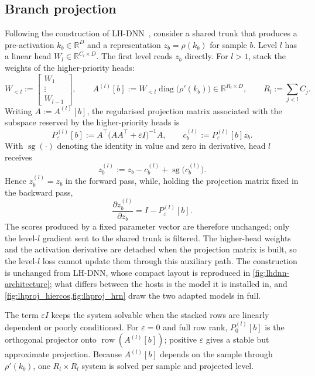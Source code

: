 \subsection{Branch projection}
\label{ssec:lhproj_construction}
\label{ssec:lhproj_forward}

Following the construction of LH-DNN~\cite{fiaschi2024informed}, consider a
shared trunk that produces a pre-activation $k_b\in\mathbb{R}^{D}$ and a
representation $z_b=\rho(k_b)$ for sample $b$. Level $l$ has a linear head
$W_l\in\mathbb{R}^{C_l\times D}$. The first level reads $z_b$ directly. For
$l>1$, stack the weights of the higher-priority heads:
\[
W_{<l}:=
\begin{bmatrix}W_1\\ \vdots\\ W_{l-1}\end{bmatrix},
\qquad
A^{(l)}[b]
:=W_{<l}\operatorname{diag}\!\big(\rho'(k_b)\big)
\in\mathbb{R}^{R_l\times D},
\qquad
R_l:=\sum_{j<l}C_j.
\]
Writing $A:=A^{(l)}[b]$, the regularised projection matrix associated with the
subspace reserved by the higher-priority heads is
\[
P^{(l)}_\varepsilon[b]
:=A^{\top}\big(AA^{\top}+\varepsilon I\big)^{-1}A,
\qquad
c_b^{(l)}:=P^{(l)}_\varepsilon[b]z_b.
\]
With $\operatorname{sg}(\cdot)$ denoting the identity in value and zero in
derivative, head $l$ receives
\[
z_b^{(l)}:=z_b-c_b^{(l)}+\operatorname{sg}\!\big(c_b^{(l)}\big).
\]
Hence $z_b^{(l)}=z_b$ in the forward pass, while, holding the projection matrix
fixed in the backward pass,
\[
\frac{\partial z_b^{(l)}}{\partial z_b}
=I-P^{(l)}_\varepsilon[b].
\]
The scores produced by a fixed parameter vector are therefore unchanged; only
the level-$l$ gradient sent to the shared trunk is filtered. The higher-head
weights and the activation derivative are detached when the projection matrix is
built, so the level-$l$ loss cannot update them through this auxiliary path.
The construction is unchanged from LH-DNN, whose compact layout is reproduced
in \cref{fig:lhdnn-architecture}; what differs between the hosts is the model
it is installed in, and \cref{fig:lhproj_hiercos,fig:lhproj_hrn} draw the two
adapted models in full.

The term $\varepsilon I$ keeps the system solvable when the stacked rows are
linearly dependent or poorly conditioned. For $\varepsilon=0$ and full row rank,
$P^{(l)}_0[b]$ is the orthogonal projector onto
$\operatorname{row}(A^{(l)}[b])$; positive $\varepsilon$ gives a stable but
approximate projection. Because $A^{(l)}[b]$ depends on the sample through
$\rho'(k_b)$, one $R_l\times R_l$ system is solved per sample and projected
level.

